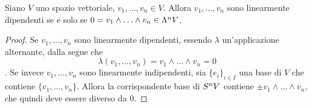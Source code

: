 \begin{corollary}
Siano $V$ uno spazio vettoriale, $v_1,\ldots, v_n\in V$. Allora $v_1,\ldots, v_n$ sono linearmente dipendenti se e solo se $0=v_1\wedge\ldots\wedge v_n\in\Lambda^nV$.
\end{corollary}
\begin{proof}
Se $v_1,\ldots,v_n$ sono linearmente dipendenti, essendo $\lambda$ un'applicazione alternante, dalla  segue che 
$$
\lambda(v_1,\ldots,v_n)=v_1\wedge\ldots\wedge v_n=0
$$
. Se invece $v_1,\ldots,v_n$ sono linearmente indipendenti, sia $\{e_i\}_{i\in I}$ una base di $V$ che contiene $\{v_1,\ldots, v_n\}$. Allora la corrispondente base di $S^nV$ contiene $\pm v_1\wedge\ldots\wedge v_n$, che quindi deve essere diverso da 0.
\end{proof}

